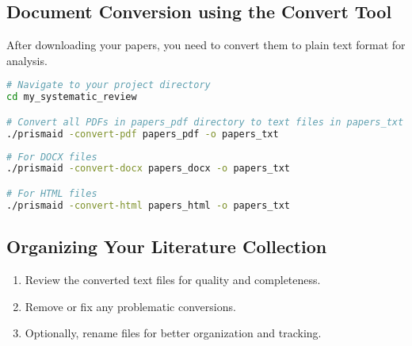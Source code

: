 
\subsection{Document Conversion using the Convert Tool}

After downloading your papers, you need to convert them to plain text format for analysis.

\begin{commandbox}
\begin{lstlisting}[language=Bash]
# Navigate to your project directory
cd my_systematic_review

# Convert all PDFs in papers_pdf directory to text files in papers_txt
./prismaid -convert-pdf papers_pdf -o papers_txt
\end{lstlisting}
\end{commandbox}

\begin{commandbox}
\begin{lstlisting}[language=Bash]
# For DOCX files
./prismaid -convert-docx papers_docx -o papers_txt

# For HTML files
./prismaid -convert-html papers_html -o papers_txt
\end{lstlisting}
\end{commandbox}


\subsection{Organizing Your Literature Collection}

\begin{enumerate}
    \item Review the converted text files for quality and completeness.
    \item Remove or fix any problematic conversions.
    \item Optionally, rename files for better organization and tracking.
\end{enumerate}


